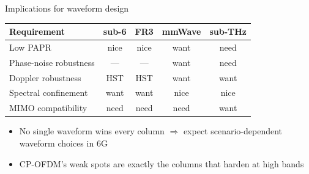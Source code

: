 \begin{frame}{Implications for waveform design}
  \centering
  \small
  \begin{tabular}{@{}lcccc@{}}
    \toprule
    \textbf{Requirement} & sub-6 & FR3 & mmWave & sub-THz \\
    \midrule
    Low PAPR                  & nice  & nice  & want & \alert{need} \\
    Phase-noise robustness    & ---   & ---   & want & \alert{need} \\
    Doppler robustness        & HST   & HST   & want & want \\
    Spectral confinement      & want  & want  & nice & nice \\
    MIMO compatibility        & \alert{need} & \alert{need} & \alert{need} & want \\
    \bottomrule
  \end{tabular}
  \vspace{2mm}
  \begin{itemize}
    \item No single waveform wins every column $\Rightarrow$ expect
          \alert{scenario-dependent waveform choices} in 6G
    \item CP-OFDM's weak spots are exactly the columns that harden at high bands
  \end{itemize}
\end{frame}
